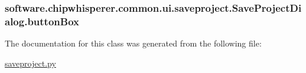 \subsubsection[{button\+Box}]{\setlength{\rightskip}{0pt plus 5cm}software.\+chipwhisperer.\+common.\+ui.\+saveproject.\+Save\+Project\+Dialog.\+button\+Box}\label{classsoftware_1_1chipwhisperer_1_1common_1_1ui_1_1saveproject_1_1SaveProjectDialog_ac079729687f3f5327de93bf1585de65c}


The documentation for this class was generated from the following file\+:\begin{DoxyCompactItemize}
\item 
\hyperlink{saveproject_8py}{saveproject.\+py}\end{DoxyCompactItemize}
